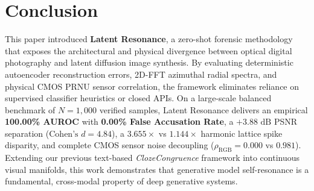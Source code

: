 \documentclass[conference]{IEEEtran}
\theoremstyle{definition}
\begin{document}
\section{Conclusion}

This paper introduced \textbf{Latent Resonance}, a zero-shot forensic methodology that exposes the architectural and physical divergence between optical digital photography and latent diffusion image synthesis. By evaluating deterministic autoencoder reconstruction errors, 2D-FFT azimuthal radial spectra, and physical CMOS PRNU sensor correlation, the framework eliminates reliance on supervised classifier heuristics or closed APIs. On a large-scale balanced benchmark of $N=1,000$ verified samples, Latent Resonance delivers an empirical \textbf{100.00\% AUROC} with \textbf{0.00\% False Accusation Rate}, a $+3.88\text{ dB}$ PSNR separation ($\text{Cohen's } d = 4.84$), a $3.655\times$ vs $1.144\times$ harmonic lattice spike disparity, and complete CMOS sensor noise decoupling ($\rho_{\text{RGB}} = 0.000$ vs $0.981$). Extending our previous text-based \textit{ClozeCongruence} framework into continuous visual manifolds, this work demonstrates that generative model self-resonance is a fundamental, cross-modal property of deep generative systems.



\end{document}

